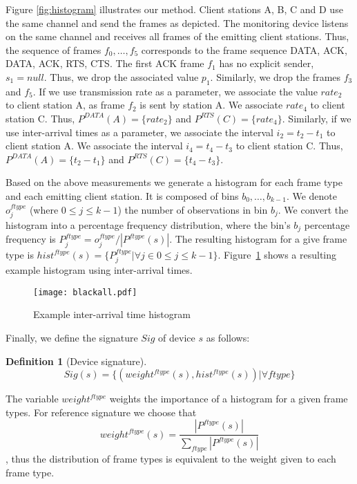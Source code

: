 \documentclass[10pt, conference, compsocconf, letterpaper]{IEEEtran}
\newtheorem{defn}{Definition}
\begin{document}
Figure \ref{fig:histogram} illustrates our method. Client stations A, B, C and D use the same channel and send the frames as depicted. The monitoring device listens on the same channel and receives all frames of the emitting client stations. Thus, the sequence of frames $f_0,\ldots,f_5$ corresponds to the frame sequence DATA, ACK, DATA, ACK, RTS, CTS.
The first ACK frame $f_1$ has no explicit sender, $s_1 = null$. Thus, we drop the associated value $p_1$. 
Similarly, we drop the frames $f_3$ and $f_5$.
If we use transmission rate as a parameter,  we associate the value $rate_2$ to client station A, as frame $f_2$ is sent by station A.
We associate $rate_4$ to client station C. 
Thus, $P^{DATA}(A) = \{rate_2\}$ and $P^{RTS}(C) = \{rate_4\}$.
Similarly, if we use inter-arrival times as a parameter, we associate the interval $i_2 = t_2 - t_1$ to client station A.
We associate the interval $i_4 = t_4 - t_3$ to client station C. 
Thus, $P^{DATA}(A) = \{t_2 - t_1\}$ and $P^{RTS}(C) = \{t_4 - t_3\}$.

Based on the above measurements we generate a histogram for each frame type and each emitting client station.
It is composed of bins $b_0,\ldots,b_{k-1}$. We denote $o^{ftype}_j$ (where $0 \le j \le k-1$) the number of observations in bin $b_j$.
We convert the histogram into a percentage frequency distribution, where the bin's $b_j$ percentage frequency   
is $P^{ftype}_j = o^{ftype}_j / |P^{ftype}(s)|$. The resulting histogram for a give frame type is $hist^{ftype}(s)=\{P^{ftype}_j| \forall j \in 0 \le j \le k-1\}$. Figure~\ref{fig:examplehisto} shows a resulting example histogram using inter-arrival times.

\begin{figure}
\begin{center}
\texttt{[image: blackall.pdf]}
\caption{Example inter-arrival time histogram}
\label{fig:examplehisto}
\end{center}
\end{figure}

Finally, we define the signature $Sig$ of device $s$ as follows:
\begin{defn}[Device signature]
$$
Sig(s)= \{(weight^{ftype}(s),hist^{ftype}(s))| \forall ftype\}
$$
\end{defn}
The variable $weight^{ftype}$ weights the importance of a histogram for a given frame types.
For reference signature we choose that $$weight^{ftype}(s)=\frac{|P^{ftype}(s)|}{\sum_{ftype}|P^{ftype}(s)|}$$, thus the distribution of frame types is equivalent to the weight given to each frame type.
 
\end{document}
